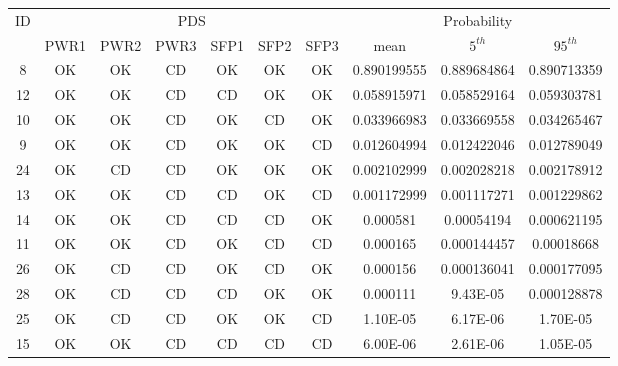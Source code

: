 \begin{table}
  \centering
  \begin{tabular}{c|cccccc|ccc}
    \hline
    ID & \multicolumn{6}{c}{PDS} & \multicolumn{3}{c}{Probability}   \\
    \cline{2-10}
         & PWR1 & PWR2 & PWR3 & SFP1 & SFP2 & SFP3 & mean & $5^{th}$ & $95^{th}$     \\
    \hline \hline
      8    & OK   & OK   & \cellcolor[gray]{0.95}CD   & OK   & OK   & OK   & 0.890199555 & 0.889684864 & 0.890713359 \\
      12   & OK   & OK   & \cellcolor[gray]{0.95}CD   & \cellcolor[gray]{0.95}CD   & OK   & OK   & 0.058915971 & 0.058529164 & 0.059303781 \\
      10   & OK   & OK   & \cellcolor[gray]{0.95}CD   & OK   & \cellcolor[gray]{0.95}CD   & OK   & 0.033966983 & 0.033669558 & 0.034265467 \\
      9    & OK   & OK   & \cellcolor[gray]{0.95}CD   & OK   & OK   & \cellcolor[gray]{0.95}CD   & 0.012604994 & 0.012422046 & 0.012789049 \\
      24   & OK   & \cellcolor[gray]{0.95}CD   & \cellcolor[gray]{0.95}CD   & OK   & OK   & OK   & 0.002102999 & 0.002028218 & 0.002178912 \\ 
      13   & OK   & OK   & \cellcolor[gray]{0.95}CD   & \cellcolor[gray]{0.95}CD   & OK   & \cellcolor[gray]{0.95}CD   & 0.001172999 & 0.001117271 & 0.001229862 \\
      14   & OK   & OK   & \cellcolor[gray]{0.95}CD   & \cellcolor[gray]{0.95}CD   & \cellcolor[gray]{0.95}CD   & OK   & 0.000581    & 0.00054194  & 0.000621195 \\    
      11   & OK   & OK   & \cellcolor[gray]{0.95}CD   & OK   & \cellcolor[gray]{0.95}CD   & \cellcolor[gray]{0.95}CD   & 0.000165    & 0.000144457 & 0.00018668  \\     
      26   & OK   & \cellcolor[gray]{0.95}CD   & \cellcolor[gray]{0.95}CD   & OK   & \cellcolor[gray]{0.95}CD   & OK   & 0.000156    & 0.000136041 & 0.000177095 \\
      28   & OK   & \cellcolor[gray]{0.95}CD   & \cellcolor[gray]{0.95}CD   & \cellcolor[gray]{0.95}CD   & OK   & OK   & 0.000111    & 9.43E-05    & 0.000128878 \\
      25   & OK   & \cellcolor[gray]{0.95}CD   & \cellcolor[gray]{0.95}CD   & OK   & OK   & \cellcolor[gray]{0.95}CD   & 1.10E-05    & 6.17E-06    & 1.70E-05    \\ 
     15   & OK   & OK   & \cellcolor[gray]{0.95}CD   & \cellcolor[gray]{0.95}CD   & \cellcolor[gray]{0.95}CD   & \cellcolor[gray]{0.95}CD   & 6.00E-06    & 2.61E-06    & 1.05E-05    \\     

\end{tabular}
\end{table}
